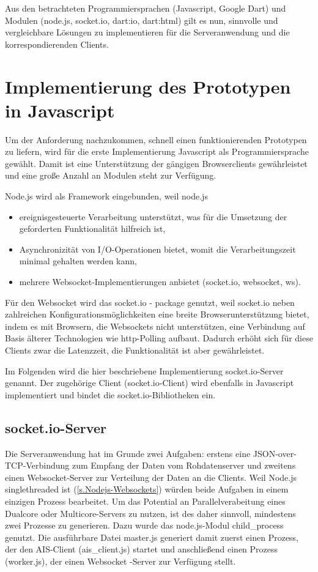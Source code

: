 Aus den betrachteten Programmiersprachen (Javascript, Google Dart) und Modulen (node.js, socket.io, dart:io, dart:html) gilt es nun, sinnvolle und vergleichbare Lösungen zu implementieren für die Serveranwendung und die korrespondierenden Clients.

\section{Implementierung des Prototypen in Javascript}
Um der Anforderung nachzukommen, schnell einen funktionierenden Prototypen zu liefern, wird für die erste Implementierung Javascript als Programmiersprache gewählt. Damit ist eine Unterstützung der gängigen Browserclients gewährleistet und eine große Anzahl an Modulen steht zur Verfügung.

Node.js wird als Framework eingebunden, weil node.js 
\begin{itemize}
\item ereignisgesteuerte Verarbeitung unterstützt, was für die Umsetzung der geforderten Funktionalität hilfreich ist,
\item Asynchronizität von I/O-Operationen bietet, womit die Verarbeitungszeit minimal gehalten werden kann,
\item mehrere Websocket-Implementierungen anbietet (socket.io, websocket, ws).
\end{itemize}
Für den Websocket wird das socket.io - package genutzt, weil socket.io neben zahlreichen Konfigurationsmöglichkeiten eine breite Browserunterstützung bietet, indem es mit Browsern, die Websockets nicht unterstützen, eine Verbindung auf Basis  älterer Technologien wie http-Polling aufbaut. Dadurch erhöht sich für diese Clients zwar die Latenzzeit, die Funktionalität ist aber gewährleistet.

Im Folgenden wird die hier beschriebene Implementierung socket.io-Server genannt. Der zugehörige Client (socket.io-Client) wird ebenfalls in Javascript implementiert und bindet die socket.io-Bibliotheken ein.

\subsection{socket.io-Server}
Die Serveranwendung hat im Grunde zwei Aufgaben: erstens eine JSON-over-TCP-Verbindung zum Empfang der Daten vom Rohdatenserver und zweitens einen Websocket-Server zur Verteilung der Daten an die Clients.
Weil Node.js singlethreaded ist (\ref{s.Nodejs-Websockets}) würden beide Aufgaben in einem einzigen Prozess bearbeitet. Um das Potential an Parallelverabeitung eines Dualcore oder Multicore-Servers zu nutzen, ist des daher sinnvoll, mindestens zwei Prozesse zu generieren. Dazu wurde das node.js-Modul child\_process genutzt. Die ausführbare Datei master.js generiert damit zuerst einen Prozess, der den AIS-Client (ais\_client.js) startet und anschließend einen Prozess (worker.js), der einen Websocket -Server zur Verfügung stellt.


